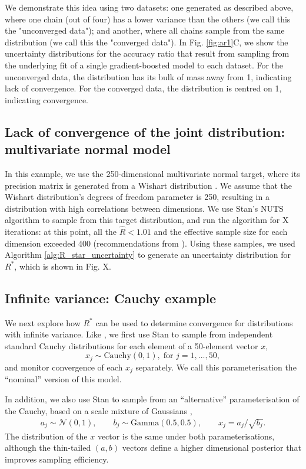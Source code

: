 \documentclass{article}
\newcommand{\N}{\mathcal{N}}
\begin{document}
We demonstrate this idea using two datasets: one generated as described above, where one chain (out of four) has a lower variance than the others (we call this the "unconverged data"); and another, where all chains sample from the same distribution (we call this the "converged data"). In Fig. \ref{fig:ar1}C, we show the uncertainty distributions for the accuracy ratio that result from sampling from the underlying fit of a single gradient-boosted model to each dataset. For the unconverged data, the distribution has its bulk of mass away from 1, indicating lack of convergence. For the converged data, the distribution is centred on 1, indicating convergence. 

\subsection{Lack of convergence of the joint distribution: multivariate normal model}\label{sec:multivariate_normal}
In this example, we use the 250-dimensional multivariate normal target, where its precision matrix is generated from a Wishart distribution \cite{hoffman2014no}. We assume that the Wishart distribution's degrees of freedom parameter is 250, resulting in a distribution with high correlations between dimensions. We use Stan's NUTS algorithm to sample from this target distribution, and run the algorithm for X iterations: at this point, all the $\hat{R}<1.01$ and the effective sample size for each dimension exceeded 400 (recommendations from \cite{vehtari2019rank}). Using these samples, we used Algorithm \ref{alg:R_star_uncertainty} to generate an uncertainty distribution for $R^*$, which is shown in Fig. X.

\subsection{Infinite variance: Cauchy example}
We next explore how $R^*$ can be used to determine convergence for distributions with infinite variance. Like \cite{vehtari2019rank}, we first use Stan to sample from independent standard Cauchy distributions for each element of a 50-element vector $x$,
%
\begin{equation}
x_j\sim \text{Cauchy}(0, 1),\; \text{for } j=1,...,50,
\end{equation}
%
and monitor convergence of each $x_j$ separately. We call this parameterisation the ``nominal'' version of this model.

In addition, we also use Stan to sample from an ``alternative'' parameterisation of the Cauchy, based on a scale mixture of Gaussians \cite{vehtari2019rank},
%
\begin{align}
a_j \sim  \N(0,1), \qquad
b_j \sim  \text{Gamma}(0.5, 0.5), \qquad
x_j =  a_j/\sqrt{b_j}.
\end{align}
%
The distribution of the $x$ vector is the same under both parameterisations, although the thin-tailed $(a,b)$ vectors define a higher dimensional posterior that improves sampling efficiency.
\end{document}
